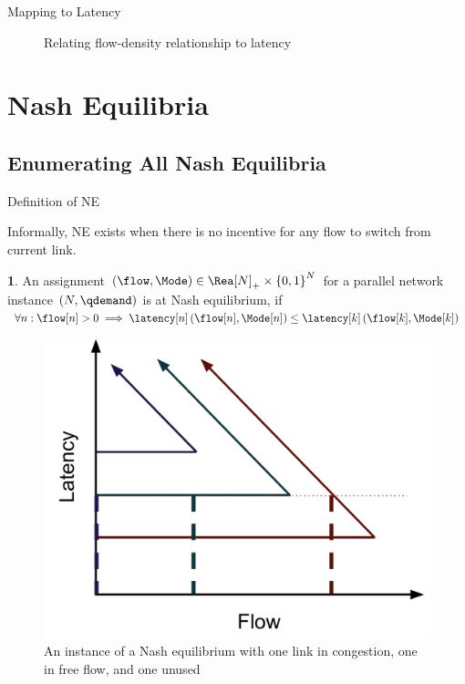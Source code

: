 \documentclass[xcolor=svgnames, english, smaller]{beamer}
\theoremstyle{plain}
\theoremstyle{definition}
\newtheorem{defn}[thm]{\protect\definitionname}
\theoremstyle{plain}
\theoremstyle{plain}
\providecommand{\definitionname}{Definition}
\begin{document}
\begin{frame}{Mapping to Latency}
\begin{figure}
\begin{centering}
\caption{Relating flow-density relationship to latency}
\par\end{centering}
\end{figure}
\end{frame}


\section{Nash Equilibria}

\subsection{Enumerating All Nash Equilibria}


\begin{frame}{Definition of NE}

	Informally, NE exists when there is no incentive for any flow to switch
from current link.
\begin{defn}
An assignment $\left(\flow,\Mode\right)\in\Rea[\NLinks]_{+}\times\left\{ 0,1\right\} ^{\NLinks}$
for a parallel network instance $\left(\NLinks,\qdemand\right)$ is
at Nash equilibrium, if $\forall\link:\flow[\link]>0\implies\latency[\link]\left(\flow[\link],\Mode[\link]\right)\le\latency[k]\left(\flow[k],\Mode[k]\right)$
\end{defn}
\begin{figure}
\begin{centering}
\includegraphics[scale=0.25]{../../figures/presentation/NE3link}
\par\end{centering}

\caption{An instance of a Nash equilibrium with one link in congestion, one
in free flow, and one unused}
\end{figure}



\end{frame}
\end{document}
